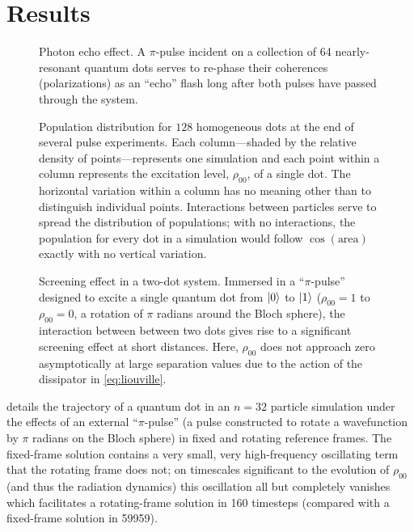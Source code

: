 \documentclass[conference]{IEEEtran}
\begin{document}
\section{Results}

\begin{figure}
  \centering
  
  \caption{\label{fig:echo} Photon echo effect.
    A $\pi$-pulse incident on a collection of 64 nearly-resonant quantum dots serves to re-phase their coherences (polarizations) as an ``echo'' flash long after both pulses have passed through the system.
  }
\end{figure}

\begin{figure}
  \centering
  
  \caption{\label{fig:decoherence}
    Population distribution for $128$ homogeneous dots at the end of several pulse experiments.
    Each column---shaded by the relative density of points---represents one simulation and each point within a column represents the excitation level, $\rho_{00}$, of a single dot.
    The horizontal variation within a column has no meaning other than to distinguish individual points.
    Interactions between particles serve to spread the distribution of populations; with no interactions, the population for every dot in a simulation would follow $\cos(\text{area})$ exactly with no vertical variation.
  }
\end{figure}

\begin{figure}
  \centering
  
  \caption{\label{fig:screening} Screening effect in a two-dot system.
  Immersed in a ``$\pi$-pulse'' designed to excite a single quantum dot from $\ket{0}$ to $\ket{1}$ ($\rho_{00} = 1$ to $\rho_{00} = 0$, a rotation of $\pi$ radians around the Bloch sphere), the interaction between between two dots gives rise to a significant screening effect at short distances.
  Here, $\rho_{00}$ does not approach zero asymptotically at large separation values due to the action of the dissipator in \cref{eq:liouville}.
  }
\end{figure}

 details the trajectory of a quantum dot in an $n=32$ particle simulation under the effects of an external ``$\pi$-pulse'' (a pulse constructed to rotate a wavefunction by $\pi$ radians on the Bloch sphere) in fixed and rotating reference frames.
The fixed-frame solution contains a very small, very high-frequency oscillating term that the rotating frame does not; on timescales significant to the evolution of $\rho_{00}$ (and thus the radiation dynamics) this oscillation all but completely vanishes which facilitates a rotating-frame solution in 160 timesteps (compared with a fixed-frame solution in 59959).
\end{document}
